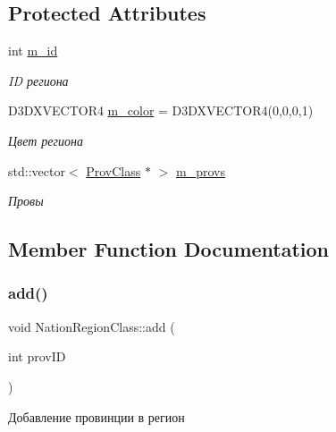 \subsection*{Protected Attributes}
\begin{DoxyCompactItemize}
\item 
int \hyperlink{class_prov_region_class_a507b91b7ae0374d4e4b0816dc3dc0c62}{m\+\_\+id}
\begin{DoxyCompactList}\small\item\em ID региона \end{DoxyCompactList}\item 
D3\+D\+X\+V\+E\+C\+T\+O\+R4 \hyperlink{class_prov_region_class_a8782e9c8135dbf5f89f0b0b64649a129}{m\+\_\+color} = D3\+D\+X\+V\+E\+C\+T\+O\+R4(0,0,0,1)
\begin{DoxyCompactList}\small\item\em Цвет региона \end{DoxyCompactList}\item 
std\+::vector$<$ \hyperlink{class_prov_class}{Prov\+Class} $\ast$ $>$ \hyperlink{class_prov_region_class_a2597561e1bac7e8514c57e9db3620e17}{m\+\_\+provs}
\begin{DoxyCompactList}\small\item\em Провы \end{DoxyCompactList}\end{DoxyCompactItemize}


\subsection{Member Function Documentation}
\mbox{\label{class_nation_region_class_ab27cc488b934845a37d02186c6b4894e}} 
\subsubsection{\texorpdfstring{add()}{add()}}
{\footnotesize\ttfamily void Nation\+Region\+Class\+::add (\begin{DoxyParamCaption}\item[{int}]{prov\+ID }\end{DoxyParamCaption})\hspace{0.3cm}{\ttfamily [virtual]}}



Добавление провинции в регион 


